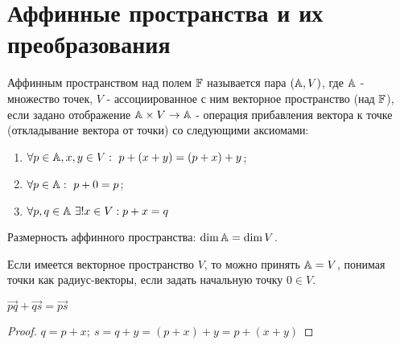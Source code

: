 \section{Аффинные пространства и их преобразования}
\begin{definition}
    Аффинным пространством над полем $\mathbb{F}$ называется пара $\\(\mathbb{A}, V)$, где $\mathbb{A}$ - множество точек, $V$ - ассоциированное с ним векторное пространство (над $\mathbb{F}$), если задано отображение $\mathbb{A} \times V \rightarrow \mathbb{A}$ - операция прибавления вектора к точке (откладывание вектора от точки) со следующими аксиомами:
    \begin{enumerate}
        \item $\forall p \in \mathbb{A}, x,y \in V : \ p + (x + y) = (p + x) + y$;
        \item $\forall p \in \mathbb{A} : \ p + 0 = p$;
        \item $\forall p, q \in \mathbb{A} \ \exists! x \in V : p + x = q$
    \end{enumerate}
    Размерность аффинного пространства: $\dim \mathbb{A} = \dim V$.
\end{definition}
\begin{remark}
    Если имеется векторное пространство $V$, то можно принять $\mathbb{A} = V$, понимая точки как радиус-векторы, если задать начальную точку $0 \in V$.
\end{remark}

\begin{subtheorem}
    $\overrightarrow{pq} + \overrightarrow{qs} = \overrightarrow{ps}$
\end{subtheorem}
\begin{proof}
    $q = p + x; \ s = q + y = (p + x) + y = p + (x + y)$
\end{proof}

